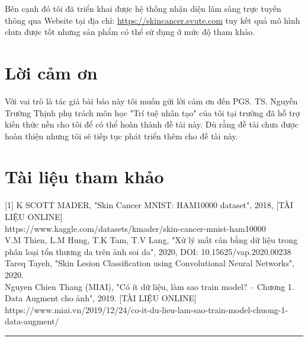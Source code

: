 \documentclass[12pt,a4paper]{article}
\begin{document}
	\noindent
	Bên cạnh đó tôi đã triển khai được hệ thống nhận diện lâm sàng trực tuyến thông qua Website tại địa chỉ: \href{https://skincancer.svute.com}{https://skincancer.svute.com} tuy kết quả mô hình chưa được tốt nhưng sản phẩm có thể sử dụng ở mức độ tham khảo.
	
	\section*{Lời cảm ơn}
	Với vai trò là tác giả bài báo này tôi muốn gửi lời cảm ơn đến PGS. TS. Nguyễn Trường Thịnh phụ trách môn học "Trí tuệ nhân tạo" của tôi tại trường đã hỗ trợ kiến thức nền cho tôi để có thể hoàn thành đề tài này. Dù rằng đề tài chưa được hoàn thiện nhưng tôi sẽ tiếp tục phát triển thêm cho đề tài này.
	
	\section*{Tài liệu tham khảo}
	[1] K SCOTT MADER, "Skin Cancer MNIST: HAM10000 dataset", 2018, [TÀI LIỆU ONLINE]\\ https://www.kaggle.com/datasets/kmader/skin-cancer-mnist-ham10000\\
	\noindent
	[2] V.M Thien, L.M Hung, T.K Tam, T.V Lang, "Xử lý mất cân bằng dữ liệu trong phân loại tổn thương da trên ảnh soi da", 2020, DOI: 10.15625/vap.2020.00238\\
	\noindent
	[3] Tareq Tayeh, "Skin Lesion Classification using Convolutional Neural Networks", 2020.\\
	\noindent
	[4] Nguyen Chien Thang (MIAI), "Có ít dữ liệu, làm sao train model? – Chương 1. Data Augment cho ảnh", 2019. [TÀI LIỆU ONLINE]\\
	https://www.miai.vn/2019/12/24/co-it-du-lieu-lam-sao-train-model-chuong-1-data-augment/\\
	
	\noindent
	\rule{\textwidth}{0.4pt}
\end{document}
